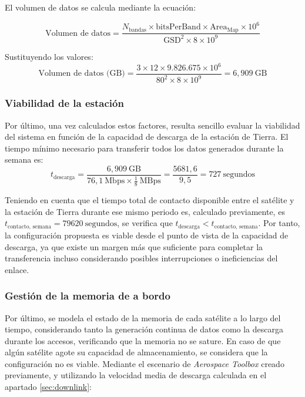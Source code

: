 El volumen de datos se calcula mediante la ecuación:

\begin{equation}
\text{Volumen de datos} = \frac{N_{\text{bandas}} \times \text{bitsPerBand} \times \text{Area}_{\text{Map}} \times 10^6}{\text{GSD}^2 \times 8 \times 10^9}
\end{equation}

Sustituyendo los valores:
\begin{equation}
\text{Volumen de datos (GB)} = \frac{3 \times 12 \times 9.826.675 \times 10^6}{80^2 \times 8 \times 10^9} = \boxed{6{,}909\ \text{GB}}
\end{equation}

\subsubsection{Viabilidad de la estación}

Por último, una vez calculados estos factores, resulta sencillo evaluar la viabilidad del sistema en función de la capacidad de descarga de la estación de Tierra. El tiempo mínimo necesario para transferir todos los datos generados durante la semana es:
\begin{equation}
t_{\text{descarga}} = \frac{6,909\ \text{GB}}{76,1\ \text{Mbps} \times \frac{1}{8}\ \text{MBps}} = \frac{5681,6}{9,5} = 727\ \text{segundos}
\end{equation}

Teniendo en cuenta que el tiempo total de contacto disponible entre el satélite y la estación de Tierra durante ese mismo periodo es, calculado previamente, es  $t_{\text{contacto, semana}} = 79620\ \text{segundos}$, se verifica que $t_{\text{descarga}} < t_{\text{contacto, semana}}$. Por tanto, la configuración propuesta es viable desde el punto de vista de la capacidad de descarga, ya que existe un margen más que suficiente para completar la transferencia incluso considerando posibles interrupciones o ineficiencias del enlace.

\subsubsection{Gestión de la memoria de a bordo}

Por último, se modela el estado de la memoria de cada satélite a lo largo del tiempo, considerando tanto la generación continua de datos como la descarga durante los accesos, verificando que la memoria no se sature. En caso de que algún satélite agote su capacidad de almacenamiento, se considera que la configuración no es viable. Mediante el escenario de \textit{Aerospace Toolbox} creado previamente, y utilizando la velocidad media de descarga calculada en el apartado \ref{sec:downlink}:

